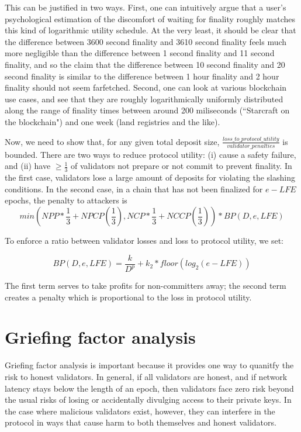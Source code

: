 \documentclass[12pt]{article}
\begin{document}
This can be justified in two ways. First, one can intuitively argue that a user's psychological estimation of the discomfort of waiting for finality roughly matches this kind of logarithmic utility schedule. At the very least, it should be clear that the difference between 3600 second finality and 3610 second finality feels much more negligible than the difference between 1 second finality and 11 second finality, and so the claim that the difference between 10 second finality and 20 second finality is similar to the difference between 1 hour finality and 2 hour finality should not seem farfetched. Second, one can look at various blockchain use cases, and see that they are roughly logarithmically uniformly distributed along the range of finality times between around 200 miliseconds (``Starcraft on the blockchain") and one week (land registries and the like).

Now, we need to show that, for any given total deposit size, $\frac{loss\_to\_protocol\_utility}{validator\_penalties}$ is bounded. There are two ways to reduce protocol utility: (i) cause a safety failure, and (ii) have $\ge \frac{1}{3}$ of validators not prepare or not commit to prevent finality. In the first case, validators lose a large amount of deposits for violating the slashing conditions. In the second case, in a chain that has not been finalized for $e - LFE$ epochs, the penalty to attackers is $$min(NPP * \frac{1}{3} + NPCP(\frac{1}{3}), NCP * \frac{1}{3} + NCCP(\frac{1}{3})) * BP(D, e, LFE)$$

To enforce a ratio between validator losses and loss to protocol utility, we set:

$$BP(D, e, LFE) = \frac{k}{D^p} + k_2 * floor(log_2(e - LFE))$$

The first term serves to take profits for non-committers away; the second term creates a penalty which is proportional to the loss in protocol utility.

\section{Griefing factor analysis}

Griefing factor analysis is important because it provides one way to quanitfy the risk to honest validators. In general, if all validators are honest, and if network latency stays below the length of an epoch, then validators face zero risk beyond the usual risks of losing or accidentally divulging access to their private keys. In the case where malicious validators exist, however, they can interfere in the protocol in ways that cause harm to both themselves and honest validators.
\end{document}
